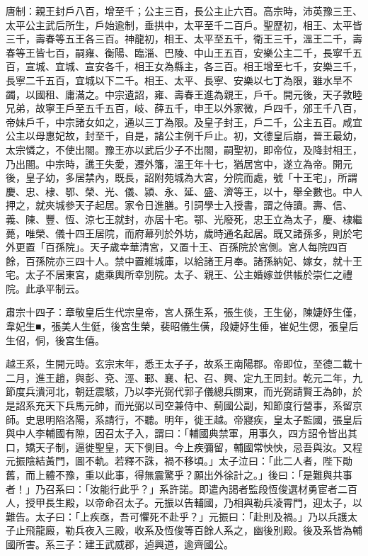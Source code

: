 \begin{pinyinscope}
 唐制：親王封戶八百，增至千；公主三百，長公主止六百。高宗時，沛英豫三王、太平公主武后所生，戶始逾制，垂拱中，太平至千二百戶。聖歷初，相王、太平皆三千，壽春等五王各三百。神龍初，相王、太平至五千，衛王三千，溫王二千，壽春等王皆七百，嗣雍、衡陽、臨淄、巴陵、中山王五百，安樂公主二千，長寧千五百，宣城、宜城、宣安各千，相王女為縣主，各三百。相王增至七千，安樂三千，長寧二千五百，宜城以下二千。相王、太平、長寧、安樂以七丁為限，雖水旱不蠲，以國租、庸滿之。中宗遺詔，雍、壽春王進為親王，戶千。開元後，天子敦睦兄弟，故寧王戶至五千五百，岐、薛五千，申王以外家微，戶四千，邠王千八百，帝妹戶千，中宗諸女如之，通以三丁為限。及皇子封王，戶二千，公主五百。咸宜公主以母惠妃故，封至千，自是，諸公主例千戶止。初，文德皇后崩，晉王最幼，太宗憐之，不使出閤。豫王亦以武后少子不出閤，嗣聖初，即帝位，及降封相王，乃出閤。中宗時，譙王失愛，遷外籓，溫王年十七，猶居宮中，遂立為帝。開元後，皇子幼，多居禁內，既長，詔附苑城為大宮，分院而處，號「十王宅」，所謂慶、忠、棣、鄂、榮、光、儀、潁、永、延、盛、濟等王，以十，舉全數也。中人押之，就夾城參天子起居。家令日進膳。引詞學士入授書，謂之侍讀。壽、信、義、陳、豐、恆、涼七王就封，亦居十宅。鄂、光廢死，忠王立為太子，慶、棣繼薨，唯榮、儀十四王居院，而府幕列於外坊，歲時通名起居。既又諸孫多，則於宅外更置「百孫院」。天子歲幸華清宮，又置十王、百孫院於宮側。宮人每院四百餘，百孫院亦三四十人。禁中置維城庫，以給諸王月奉。諸孫納妃、嫁女，就十王宅。太子不居東宮，處乘輿所幸別院。太子、親王、公主婚嫁並供帳於崇仁之禮院。此承平制云。



 肅宗十四子：章敬皇后生代宗皇帝，宮人孫生系，張生倓，王生佖，陳婕妤生僅，韋妃生■，張美人生侹，後宮生榮，裴昭儀生僙，段婕妤生倕，崔妃生偲，張皇后生佋，侗，後宮生僖。



 越王系，生開元時。玄宗末年，悉王太子子，故系王南陽郡。帝即位，至德二載十二月，進王趙，與彭、兗、涇、鄆、襄、杞、召、興、定九王同封。乾元二年，九節度兵潰河北，朝廷震駭，乃以李光弼代郭子儀總兵關東，而光弼請賢王為帥，於是詔系充天下兵馬元帥，而光弼以司空兼侍中、薊國公副，知節度行營事，系留京師。史思明陷洛陽，系請行，不聽。明年，徙王越。帝寢疾，皇太子監國，張皇后與中人李輔國有隙，因召太子入，謂曰：「輔國典禁軍，用事久，四方詔令皆出其口，矯天子制，逼徙聖皇，天下側目。今上疾彌留，輔國常怏怏，忌吾與汝。又程元振陰結黃門，圖不軌。若釋不誅，禍不移頃。」太子泣曰：「此二人者，陛下勛舊，而上體不豫，重以此事，得無震驚乎？願出外徐計之。」後曰：「是難與共事者！」乃召系曰：「汝能行此乎？」系許諾。即遣內謁者監段恆俊選材勇宦者二百人，授甲長生殿，以帝命召太子。元振以告輔國，乃相與勒兵凌霄門，迎太子，以難告。太子曰：「上疾亟，吾可懼死不赴乎？」元振曰：「赴則及禍。」乃以兵護太子止飛龍廄，勒兵夜入三殿，收系及恆俊等百餘人系之，幽後別殿。後及系皆為輔國所害。系三子：建王武威郡，逌興道，逾齊國公。




\end{pinyinscope}
